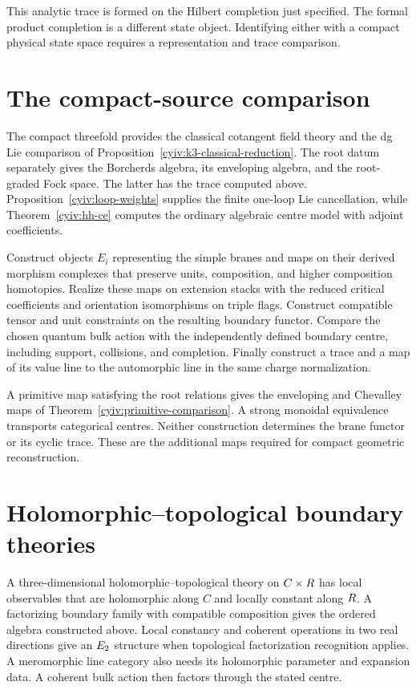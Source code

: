 This analytic trace is formed on the Hilbert completion just specified.
The formal product completion is a different state object. Identifying
either with a compact physical state space requires a representation
and trace comparison.

\section{The compact-source comparison}
The compact threefold provides the classical cotangent field theory
and the dg Lie comparison of Proposition~\ref{cyiv:k3-classical-reduction}.
The root datum separately gives the Borcherds algebra, its enveloping
algebra, and the root-graded Fock space.
The latter has the trace computed above.
Proposition~\ref{cyiv:loop-weights} supplies the finite one-loop Lie
cancellation, while Theorem~\ref{cyiv:hh-ce} computes the ordinary
algebraic centre model with adjoint coefficients.

\begin{problem}\label{cyiv:compact-comparison}
Construct objects $E_i$ representing the simple branes and maps on their
derived morphism complexes that preserve units, composition, and higher
composition homotopies.
Realize these maps on extension stacks with the reduced critical
coefficients and orientation isomorphisms on triple flags.
Construct compatible tensor and unit constraints on the resulting
boundary functor.
Compare the chosen quantum bulk action with the independently defined
boundary centre, including support, collisions, and completion.
Finally construct a trace and a map of its value line to the automorphic
line in the same charge normalization.
\end{problem}

A primitive map satisfying the root relations gives the enveloping and
Chevalley maps of Theorem~\ref{cyiv:primitive-comparison}.
A strong monoidal equivalence transports categorical centres.
Neither construction determines the brane functor or its cyclic trace.
These are the additional maps required for compact geometric
reconstruction.

\section{Holomorphic--topological boundary theories}
A three-dimensional holomorphic--topological theory on $C\times R$ has local observables that are holomorphic along $C$ and locally constant along $R$. A factorizing boundary family with compatible composition gives the
ordered algebra constructed above. Local constancy and coherent
operations in two real directions give an $E_2$ structure when
topological factorization recognition applies. A meromorphic line
category also needs its holomorphic parameter and expansion data.
A coherent bulk action then factors through the stated centre.

